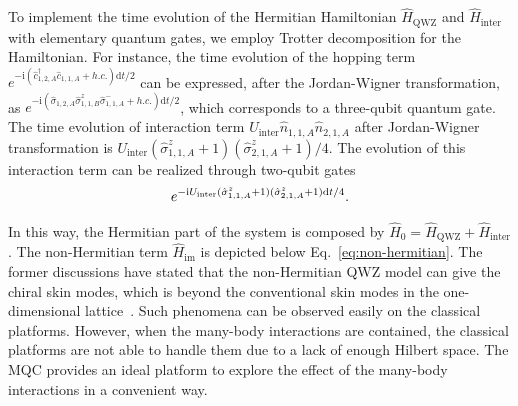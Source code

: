 \documentclass[longbibliography, aps, prx, amsmath, amssymb, amsfonts, twocolumn,superscriptaddress, footinbib]{revtex4-1}
\begin{document}
	To implement the time evolution of the Hermitian Hamiltonian $\hat{H}_{\text{QWZ}}$ and $\hat{H}_{\text{inter}}$ with elementary quantum gates, we employ Trotter decomposition for the Hamiltonian. For instance, the time evolution of the hopping term $e^{-\mathrm{i}  (\hat{c}_{1,2,A}^{\dagger} \hat{c}_{1,1,A} +h.c.)\mathrm{d} t/2}$ can be expressed, after the Jordan-Wigner transformation, as $e^{-\mathrm{i} (\hat{\sigma}_{1,2,A} \hat{\sigma}^z_{1,1,B}\hat{\sigma}_{1,1,A}^{-} +h.c.)\mathrm{d} t /2}$, which corresponds to a three-qubit quantum gate.
	The time evolution of interaction term $ U_{\text{inter}} \hat{n}_{1, 1, A} \hat{n}_{2,1,A}$ after Jordan-Wigner transformation is $U_{\text{inter}} (\hat{\sigma}^z_{1,1,A}+1)(\hat{\sigma}^z_{2,1,A}+1)/4$. The evolution of this interaction term can be realized through two-qubit gates 
	\begin{equation}
		e^{-\mathrm{i} U_{\text{inter}} (\hat{\sigma}^z_{1,1,A}+1) (\hat{\sigma}^z_{2,1,A}+1) \mathrm{d}t/4 }. \notag
	\end{equation}

	In this way, the Hermitian part of the system is composed by $\hat{H}_0=\hat{H}_{\text{QWZ}}+\hat{H}_{\text{inter}}$. The non-Hermitian term $\hat{H}_{\text{im}}$ is depicted below Eq.~\eqref{eq:non-hermitian}. The former discussions have stated that the non-Hermitian QWZ model can give the chiral skin modes, which is beyond the conventional skin modes in the one-dimensional lattice~\cite{nakamura2023universal, ma2024non,schindler2023hermitian}. Such phenomena can be observed easily on the classical platforms. However, when the many-body interactions are contained, the classical platforms are not able to handle them due to a lack of enough Hilbert space. The MQC provides an ideal platform to explore the effect of the many-body interactions in a convenient way.

\end{document}
